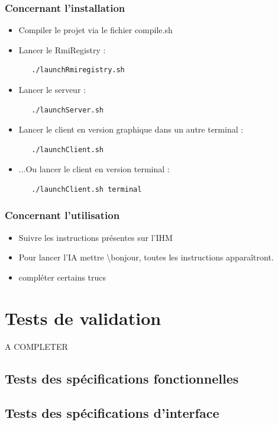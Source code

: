 \documentclass[11pt,dvipsnames,svgnames]{report}
\begin{document}
\subsubsection{Concernant l'installation}
\begin{itemize}
\item Compiler le projet via le fichier compile.sh
\item Lancer le RmiRegistry :
\begin{lstlisting}
   ./launchRmiregistry.sh
\end{lstlisting}
\item Lancer le serveur :
\begin{lstlisting}
   ./launchServer.sh
\end{lstlisting}
\item Lancer le client en version graphique dans un autre terminal : 
\begin{lstlisting}
   ./launchClient.sh 
\end{lstlisting}
\item ...Ou lancer le client en version terminal :
\begin{lstlisting}
   ./launchClient.sh terminal
\end{lstlisting}
\end{itemize}

\subsubsection{Concernant l'utilisation}
\begin{itemize}
\item Suivre les instructions présentes sur l'IHM
\item Pour lancer l'IA mettre \textbackslash bonjour, toutes les instructions apparaîtront.
\item compléter certains trucs
\end{itemize}

\section{Tests de validation}
A COMPLETER
\subsection{Tests des spécifications fonctionnelles}
\subsection{Tests des spécifications d'interface}
\end{document}
